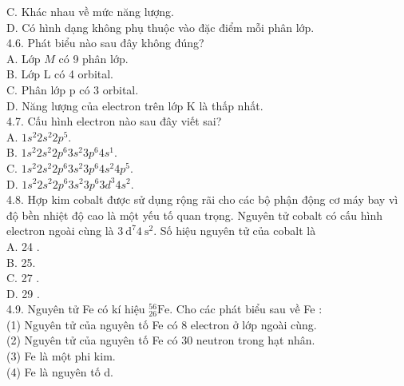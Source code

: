 \documentclass[10pt]{article}
\begin{document}
C. Khác nhau về mức năng lượng.\\
D. Có hình dạng không phụ thuộc vào đặc điểm mỗi phân lớp.\\
4.6. Phát biểu nào sau đây không đúng?\\
A. Lớp $M$ có 9 phân lớp.\\
B. Lớp L có 4 orbital.\\
C. Phân lớp p có 3 orbital.\\
D. Năng lượng của electron trên lớp K là thấp nhất.\\
4.7. Cấu hình electron nào sau đây viết sai?\\
A. $1 s^{2} 2 s^{2} 2 p^{5}$.\\
B. $1 s^{2} 2 s^{2} 2 p^{6} 3 s^{2} 3 p^{6} 4 s^{1}$.\\
C. $1 s^{2} 2 s^{2} 2 p^{6} 3 s^{2} 3 p^{6} 4 s^{2} 4 p^{5}$.\\
D. $1 s^{2} 2 s^{2} 2 p^{6} 3 s^{2} 3 p^{6} 3 d^{3} 4 s^{2}$.\\
4.8. Hợp kim cobalt được sử dụng rộng rãi cho các bộ phận động cơ máy bay vì độ bền nhiệt độ cao là một yếu tố quan trọng. Nguyên tử cobalt có cấu hình electron ngoài cùng là $3 \mathrm{~d}^{7} 4 \mathrm{~s}^{2}$. Số hiệu nguyên tử của cobalt là\\
A. 24 .\\
B. 25.\\
C. 27 .\\
D. 29 .\\
4.9. Nguyên tử Fe có kí hiệu ${ }_{26}^{56} \mathrm{Fe}$. Cho các phát biểu sau về Fe :\\
(1) Nguyên tử của nguyên tố Fe có 8 electron ở lớp ngoài cùng.\\
(2) Nguyên tử của nguyên tố Fe có 30 neutron trong hạt nhân.\\
(3) Fe là một phi kim.\\
(4) Fe là nguyên tố d.
\end{document}
